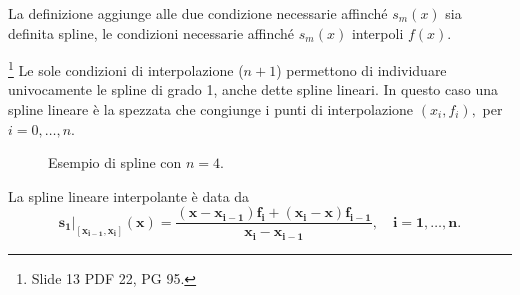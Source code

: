 La definizione aggiunge alle due condizione necessarie affinché $s_m(x)$ sia definita spline, le condizioni necessarie affinché $s_m(x)$ interpoli $f(x)$.

\begin{remark}
    \footnote{Slide 13 PDF 22, PG 95.} Le sole condizioni di interpolazione ($n+1$) permettono di individuare univocamente le spline di grado 1, anche dette spline lineari. In questo caso una spline lineare è la spezzata che congiunge i punti di interpolazione $(x_i,f_i),$ per $i=0,\hdots, n$.
\end{remark}


\begin{figure}[ht]
	\centering
	\caption{Esempio di spline con $n=4$.}\label{fig:s_mN=4}
\end{figure}

\begin{definition}
	La spline lineare interpolante è data da 
	\begin{equation}\label{eq:spline_lineare}
		\boldsymbol{s_1|_{[x_{i-1}, x_i]}(x)=\frac{(x-x_{i-1})f_i+(x_i-x)f_{i-1}}{x_i-x_{i-1}},\quad i=1,\hdots,n.}
	\end{equation}
\end{definition}

